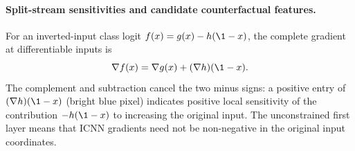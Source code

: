 

\paragraph{Split-stream sensitivities and candidate counterfactual features.}\label{subsec:counterfactual_features}

For an inverted-input class logit $f(x)=g(x)-h(\1-x)$, the complete gradient at differentiable inputs is
\[
\nabla f(x)=\nabla g(x)+(\nabla h)(\1-x).
\]
The complement and subtraction cancel the two minus signs: a positive entry of $(\nabla h)(\1-x)$ (bright blue pixel) indicates positive local sensitivity of the contribution $-h(\1-x)$ to increasing the original input. The unconstrained first layer means that ICNN gradients need not be non-negative in the original input coordinates.

